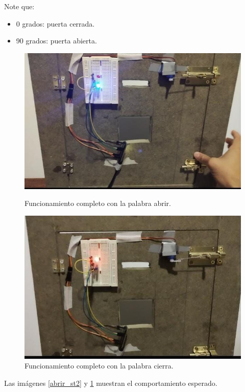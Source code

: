 Note que:
\begin{itemize}
    \item 0 grados: puerta cerrada.
    \item 90 grados: puerta abierta.
\end{itemize}
\begin{figure}[H]
   \begin{minipage}{0.48\textwidth}
     \centering
    \includegraphics[width=.6\linewidth]{Img/abrir_st2.jpg}
    \caption{Funcionamiento completo con la palabra abrir.}
    \label{abrir_st2}
   \end{minipage}\hfill
   \begin{minipage}{0.48\textwidth}
     \centering
    \includegraphics[width=.6\linewidth]{Img/cierra_st2.jpg}
    \caption{Funcionamiento completo con la palabra cierra.}
    \label{cierra_st2}     
   \end{minipage}
\end{figure}
Las imágenes \ref{abrir_st2} y \ref{cierra_st2} muestran el comportamiento esperado. 


